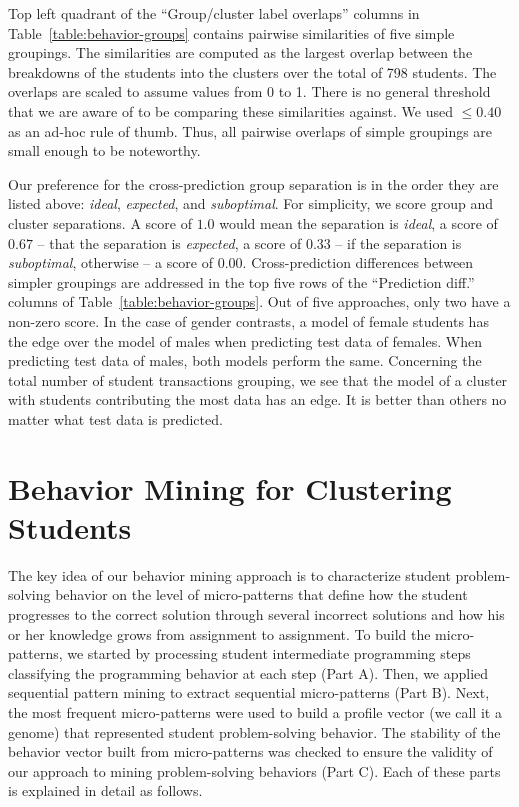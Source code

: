 \documentclass{sigchi}
\begin{document}
Top left quadrant of the ``Group/cluster label overlaps'' columns in Table~\ref{table:behavior-groups} contains pairwise similarities of five simple groupings. The similarities are computed as the largest overlap between the breakdowns of the students into the clusters over the total of 798 students. The overlaps are scaled to assume values from 0 to 1. There is no general threshold that we are aware of to be comparing these similarities against. We used $\leq 0.40$ as an ad-hoc rule of thumb. Thus, all pairwise overlaps of simple groupings are small enough to be noteworthy.

Our preference for the cross-prediction group separation is in the order they are listed above: \textit{ideal}, \textit{expected}, and \textit{suboptimal}. For simplicity, we score group and cluster separations. A score of $1.0$ would mean the separation is \textit{ideal}, a score of $0.67$ -- that the separation is \textit{expected}, a score of $0.33$ -- if the separation is \textit{suboptimal}, otherwise -- a score of $0.00$. Cross-prediction differences between simpler groupings are addressed in the top five rows of the ``Prediction diff.'' columns of Table~\ref{table:behavior-groups}. Out of five approaches, only two have a non-zero score. In the case of gender contrasts, a model of female students has the edge over the model of males when predicting test data of females. When predicting test data of males, both models perform the same. Concerning the total number of student transactions grouping, we see that the model of a cluster with students contributing the most data has an edge. It is better than others no matter what test data is predicted. 

\section{Behavior Mining for Clustering Students}

The key idea of our behavior mining approach is to characterize student problem-solving behavior on the level of micro-patterns that define how the student progresses to the correct solution through several incorrect solutions and how his or her knowledge grows from assignment to assignment. To build the micro-patterns, we started by processing student intermediate programming steps classifying the programming behavior at each step (Part A). Then, we applied sequential pattern mining to extract sequential micro-patterns (Part B). Next, the most frequent micro-patterns were used to build a profile vector (we call it a genome) that represented student problem-solving behavior. The stability of the behavior vector built from micro-patterns was checked to ensure the validity of our approach to mining problem-solving behaviors (Part C). Each of these parts is explained in detail as follows.
\end{document}
